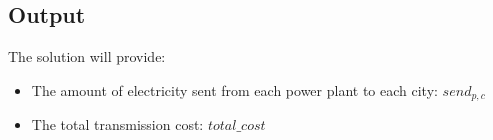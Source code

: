 \documentclass{article}
\begin{document}
\subsection*{Output}
The solution will provide:
\begin{itemize}
    \item The amount of electricity sent from each power plant to each city: $send_{p,c}$
    \item The total transmission cost: $total\_cost$
\end{itemize}
\end{document}
